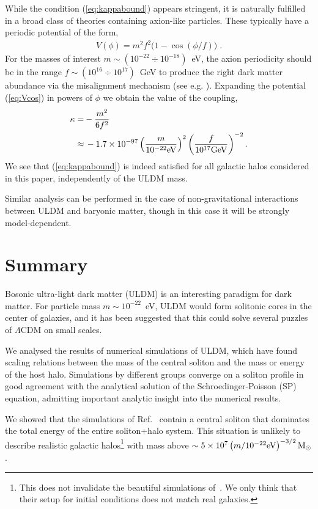 \documentclass[aps,prd,floats,superscriptaddress,showpacs,nofootinbib,twocolumn,preprintnumbers]{revtex4-1}%
\def\be{\begin{eqnarray}}
\def\ee{\end{eqnarray}}
\begin{document}
While the condition (\ref{eq:kappabound}) appears stringent, it is
naturally fulfilled in a broad class of theories containing 
axion-like particles. These typically have a periodic potential of the form,
\be
\label{eq:Vcos}
V(\phi)=m^2f^2\big(1-\cos(\phi/f)\big)\;.
\ee
For the masses of interest $m\sim (10^{-22}\div 10^{-18})$~eV, the
axion periodicity should be in the range
$f\sim (10^{16}\div 10^{17})$~GeV to produce the right dark matter
abundance via the misalignment mechanism (see e.g.
\cite{Hui:2016ltb}). Expanding the potential (\ref{eq:Vcos}) in powers
of $\phi$ we obtain the value of the coupling,
\be
\begin{split}
\kappa=&-\frac{m^2}{6f^2}\\
\approx&\,-1.7\times 10^{-97}\left(\frac{m}{10^{-22}{\rm eV}}\right)^2
\left(\frac{f}{10^{17}{\rm GeV}}\right)^{-2}.
\end{split}
\ee
We see that (\ref{eq:kappabound}) is indeed satisfied for all galactic
halos considered in this paper, independently of the ULDM mass.

Similar analysis can be performed in the case of non-gravitational
interactions between ULDM and baryonic matter, though in this case it
will be strongly model-dependent.



\section{Summary}\label{s:sum}
%

Bosonic ultra-light dark matter (ULDM) is an interesting paradigm for
dark matter. For particle mass $m\sim10^{-22}$~eV, ULDM would form
solitonic cores in the center of galaxies, and it has been suggested
that this could solve several puzzles of $\Lambda$CDM on small scales.  

We analysed the results of numerical simulations of ULDM, which have
found 
scaling relations between the mass of the central soliton and the mass or
energy of the host halo. Simulations by different groups converge on a
soliton profile in good agreement with the analytical solution of the
Schroedinger-Poisson (SP) equation, admitting important analytic insight
into the numerical results. 

We showed that the simulations of Ref.~\cite{Mocz:2017wlg} contain a
central soliton that dominates the total energy of the entire
soliton+halo system. This situation is unlikely to describe realistic
galactic halos\footnote{This does not invalidate the beautiful
  simulations of~\cite{Mocz:2017wlg}. We only think that their setup
  for initial conditions
  does not match real galaxies.} 
%
 with mass above $\sim5\times
10^7\left(m/10^{-22}{\rm eV}\right)^{-3/2}
{\rm M}_\odot$.
\end{document}
